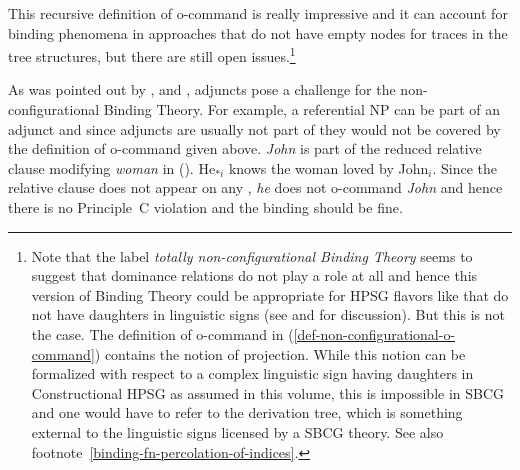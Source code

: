 \documentclass[output=paper
 	        ,biblatex
                ,babelshorthands
                ,newtxmath
                ,draftmode
                ,colorlinks, citecolor=brown
]{langscibook}
\begin{document}
This recursive definition of o-command is really impressive and it can account for binding phenomena
in approaches that do not have empty nodes for traces in the tree structures, but there are still open
issues.\footnote{%
Note that the label \emph{totally non-configurational Binding Theory} seems to suggest that
dominance relations do not play a role at all and hence this version of Binding Theory could be appropriate for
HPSG flavors like \sbcg that do not have daughters in linguistic signs (see  and
 for discussion). But this is not the case. The definition of o-command in
(\ref{def-non-configurational-o-command}) contains the notion of projection. While this notion can
be formalized with respect to a complex linguistic sign having daughters in Constructional HPSG as
assumed in this volume, this is impossible in SBCG and one would have to refer to the derivation
tree, which is something external to the linguistic signs licensed by a SBCG theory. See also footnote~\ref{binding-fn-percolation-of-indices}.%
}

As was pointed out by \citet[]{HL96a}, \citet[Sect~20.4.1]{Mueller99a} and \citet{Walker2011a}, adjuncts pose a challenge for the
non-configurational Binding Theory. For example, a referential NP can be part of an adjunct and
since adjuncts are usually not part of \argstls they would not be covered by the definition of
o-command given above. \emph{John} is part of the reduced relative clause modifying \emph{woman} in
().
\ea
\label{ex-he-knows-the-woman-loved-by-John}
He$_{*i}$ knows the woman loved by John$_i$.
\z
Since the relative clause does not appear on any \argstl, \emph{he} does not o-command \emph{John}
and hence there is no Principle~C violation and the binding should be fine.
\end{document}
